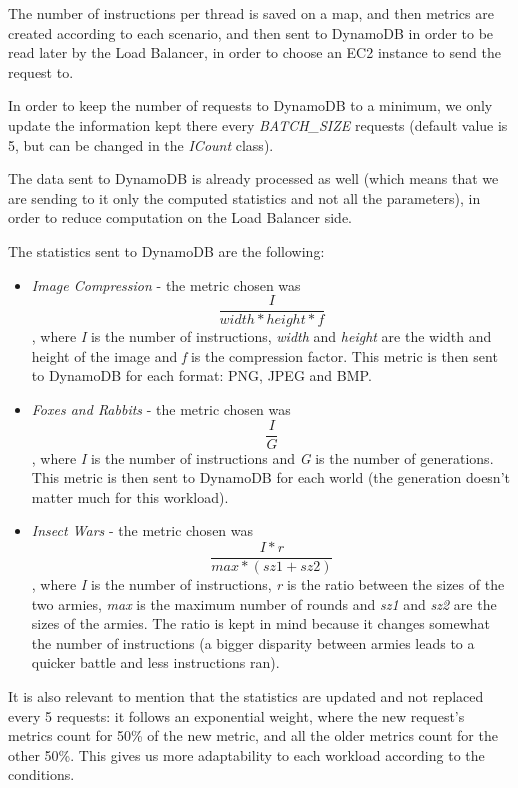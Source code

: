 \documentclass{article}
\begin{document}
The number of instructions per thread is saved on a map, and then metrics are
created according to each scenario, and then sent to DynamoDB in order to be
read later by the Load Balancer, in order to choose an EC2 instance to send the
request to.

In order to keep the number of requests to DynamoDB to a minimum, we only
update the information kept there every \textit{BATCH\_SIZE} requests (default
value is 5, but can be changed in the \textit{ICount} class).

The data sent to DynamoDB is already processed as well (which means that we are
sending to it only the computed statistics and not all the parameters), in order
to reduce computation on the Load Balancer side.

The statistics sent to DynamoDB are the following:

\begin{itemize}
    \item \textit{Image Compression} - the metric chosen was
        \[\frac{I}{width*height*f}\], where \textit{I} is the number of
        instructions, \textit{width} and \textit{height} are the width and
        height of the image and \textit{f} is the compression factor. This
        metric is then sent to DynamoDB for each format: PNG, JPEG and BMP. 
    \item \textit{Foxes and Rabbits} - the metric chosen was \[\frac{I}{G}\], 
        where \textit{I} is the number of instructions and \textit{G} is the
        number of generations. This metric is then sent to DynamoDB for each
        world (the generation doesn't matter much for this workload).
    \item \textit{Insect Wars} - the metric chosen was
        \[\frac{I*r}{max*(sz1+sz2)}\], where \textit{I} is the number of
        instructions, \textit{r} is the ratio between the sizes of the two
        armies, \textit{max} is the maximum number of rounds and \textit{sz1}
        and \textit{sz2} are the sizes of the armies. The ratio is kept in mind
        because it changes somewhat the number of instructions (a bigger
        disparity between armies leads to a quicker battle and less instructions
        ran).
\end{itemize}

It is also relevant to mention that the statistics are updated and not replaced
every 5 requests: it follows an exponential weight, where the new request's
metrics count for 50\% of the new metric, and all the older metrics count for
the other 50\%. This gives us more adaptability to each workload according to
the conditions.
\end{document}
